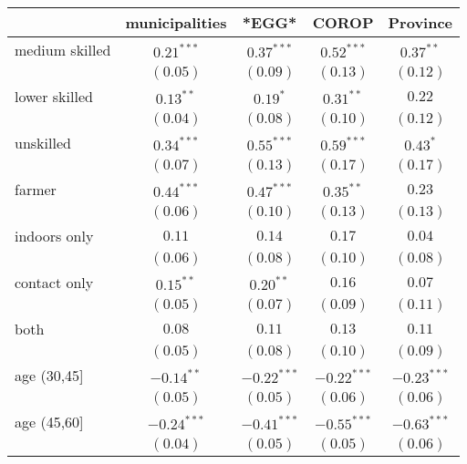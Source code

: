 
\begin{table}[h!]
\begin{center}
\begin{small}
\begin{tabular}{l c c c c}
\hline
 & municipalities & *EGG* & COROP & Province \\
\hline
medium skilled     & $0.21^{***}$  & $0.37^{***}$  & $0.52^{***}$  & $0.37^{**}$   \\
                   & $(0.05)$      & $(0.09)$      & $(0.13)$      & $(0.12)$      \\
lower skilled      & $0.13^{**}$   & $0.19^{*}$    & $0.31^{**}$   & $0.22$        \\
                   & $(0.04)$      & $(0.08)$      & $(0.10)$      & $(0.12)$      \\
unskilled          & $0.34^{***}$  & $0.55^{***}$  & $0.59^{***}$  & $0.43^{*}$    \\
                   & $(0.07)$      & $(0.13)$      & $(0.17)$      & $(0.17)$      \\
farmer             & $0.44^{***}$  & $0.47^{***}$  & $0.35^{**}$   & $0.23$        \\
                   & $(0.06)$      & $(0.10)$      & $(0.13)$      & $(0.13)$      \\
indoors only       & $0.11$        & $0.14$        & $0.17$        & $0.04$        \\
                   & $(0.06)$      & $(0.08)$      & $(0.10)$      & $(0.08)$      \\
contact only       & $0.15^{**}$   & $0.20^{**}$   & $0.16$        & $0.07$        \\
                   & $(0.05)$      & $(0.07)$      & $(0.09)$      & $(0.11)$      \\
both               & $0.08$        & $0.11$        & $0.13$        & $0.11$        \\
                   & $(0.05)$      & $(0.08)$      & $(0.10)$      & $(0.09)$      \\
age (30,45]        & $-0.14^{**}$  & $-0.22^{***}$ & $-0.22^{***}$ & $-0.23^{***}$ \\
                   & $(0.05)$      & $(0.05)$      & $(0.06)$      & $(0.06)$      \\
age (45,60]        & $-0.24^{***}$ & $-0.41^{***}$ & $-0.55^{***}$ & $-0.63^{***}$ \\
                   & $(0.04)$      & $(0.05)$      & $(0.05)$      & $(0.06)$      \\

\end{tabular}
\end{small}
\end{center}
\end{table}
